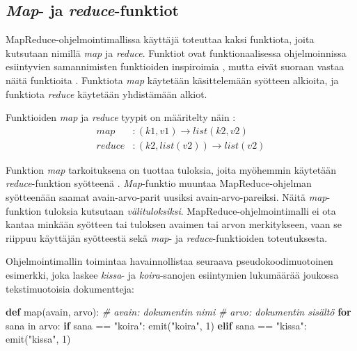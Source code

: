 \documentclass[finnish]{templates/tktltiki2}
\newenvironment{Shaded}{}{}
\newcommand{\KeywordTok}[1]{\textcolor[rgb]{0.00,0.44,0.13}{\textbf{{#1}}}}
\newcommand{\DataTypeTok}[1]{\textcolor[rgb]{0.56,0.13,0.00}{{#1}}}
\newcommand{\DecValTok}[1]{\textcolor[rgb]{0.25,0.63,0.44}{{#1}}}
\newcommand{\StringTok}[1]{\textcolor[rgb]{0.25,0.44,0.63}{{#1}}}
\newcommand{\CommentTok}[1]{\textcolor[rgb]{0.38,0.63,0.69}{\textit{{#1}}}}
\newcommand{\NormalTok}[1]{{#1}}
\theoremstyle{definition}
\theoremstyle{remark}
\begin{document}
\subsection{\emph{Map}- ja
\emph{reduce}-funktiot}\label{map--ja-reduce-funktiot}

MapReduce-ohjelmointimallissa käyttäjä toteuttaa kaksi funktiota, joita
kutsutaan nimillä \emph{map} ja \emph{reduce}. Funktiot ovat
funktionaalisessa ohjelmoinnissa esiintyvien samannimisten funktioiden
inspiroimia \cite{mapreduce}, mutta eivät suoraan vastaa
näitä funktioita \cite{mapreduce-revisited}. Funktiota
\emph{map} käytetään käsittelemään syötteen alkioita, ja funktiota
\emph{reduce} käytetään yhdistämään alkiot.

Funktioiden \emph{map} ja \emph{reduce} tyypit on määritelty näin
\cite{mapreduce}: \[
\begin{aligned}
map &: (k1, v1) \to list(k2, v2) \\
reduce &: (k2, list(v2)) \to list(v2)
\end{aligned}
\]

Funktion \emph{map} tarkoituksena on tuottaa tuloksia, joita myöhemmin
käytetään \emph{reduce}-funktion syötteenä \cite{mapreduce}.
\emph{Map}-funktio muuntaa MapReduce-ohjelman syötteenään saamat
avain-arvo-parit uusiksi avain-arvo-pareiksi. Näitä \emph{map}-funktion
tuloksia kutsutaan \emph{välituloksiksi}. MapReduce-ohjelmointimalli ei
ota kantaa minkään syötteen tai tuloksen avaimen tai arvon merkitykseen,
vaan se riippuu käyttäjän syötteestä sekä \emph{map}- ja
\emph{reduce}-funktioiden toteutuksesta.

Ohjelmointimallin toimintaa havainnollistaa seuraava
pseudokoodimuotoinen esimerkki, joka laskee \emph{kissa}- ja
\emph{koira}-sanojen esiintymien lukumäärää joukossa tekstimuotoisia
dokumentteja:

\begin{Shaded}
\begin{Highlighting}[]
\KeywordTok{def} \DataTypeTok{map}\NormalTok{(avain, arvo):}
    \CommentTok{# avain: dokumentin nimi}
    \CommentTok{# arvo: dokumentin sisältö}
    \KeywordTok{for} \NormalTok{sana in arvo:}
        \KeywordTok{if} \NormalTok{sana == }\StringTok{"koira"}\NormalTok{:}
            \NormalTok{emit(}\StringTok{"koira"}\NormalTok{, }\DecValTok{1}\NormalTok{)}
        \KeywordTok{elif} \NormalTok{sana == }\StringTok{"kissa"}\NormalTok{:}
            \NormalTok{emit(}\StringTok{"kissa"}\NormalTok{, }\DecValTok{1}\NormalTok{)    }
\end{Highlighting}
\end{Shaded}
\end{document}
